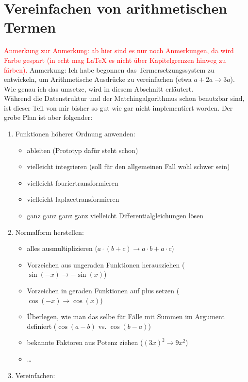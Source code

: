 \documentclass{scrartcl}
\numberwithin{figure}{section} %
\theoremstyle{definition} %
\begin{document}
\section{Vereinfachen von arithmetischen Termen}
\begin{itshape}
\textcolor{red} {Anmerkung zur Anmerkung: ab hier sind es nur noch Anmerkungen, da wird Farbe gespart (in echt mag \LaTeX{}  es nicht über Kapitelgrenzen hinweg zu färben).}
Anmerkung: Ich habe begonnen das Termersetzungssystem zu entwickeln, um Arithmetische Ausdrücke zu vereinfachen (etwa $a + 2 a \rightarrow 3 a$). Wie genau ich das umsetze, wird in diesem Abschnitt erläutert.
\\Während die Datenstruktur und der Matchingalgorithmus schon benutzbar sind, ist dieser Teil von mir bisher so gut wie gar nicht implementiert worden. Der grobe Plan ist aber folgender:
\begin{enumerate}
    \item Funktionen höherer Ordnung anwenden:
    \begin{itemize}
        \item ableiten (Prototyp dafür steht schon)
        \item vielleicht integrieren (soll für den allgemeinen Fall wohl schwer sein)
        \item vielleicht fouriertransformieren
        \item vielleicht laplacetransformieren
        \item ganz ganz ganz ganz vielleicht Differentialgleichungen lösen
    \end{itemize}
    \item Normalform herstellen:
    \begin{itemize}
        \item alles ausmultiplizieren ($a\cdot (b + c) \rightarrow a\cdot b + a\cdot c$)
        \item Vorzeichen aus ungeraden Funktionen herausziehen ($\sin(-x) \rightarrow -\sin(x)$)
        \item Vorzeichen in geraden Funktionen auf plus setzen ($\cos(-x) \rightarrow \cos(x)$)
        \item Überlegen, wie man das selbe für Fälle mit Summen im Argument definiert ($\cos(a - b)$ vs. $\cos(b - a)$)
        \item bekannte Faktoren aus Potenz ziehen ($(3 x)^2 \rightarrow 9 x^2$)
        \item \dots
    \end{itemize}
    \item Vereinfachen:

\end{enumerate}
\end{itshape}
\end{document}
